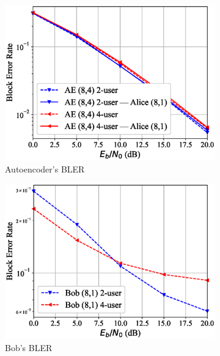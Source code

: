 \begin{figure}
	\begin{subfigure}{0.3\textwidth}
		\includegraphics[width=\linewidth]{figs/multi_covert_autoencoder_bler_rayleigh}
		\caption{Autoencoder's BLER}
		\label{fig:multi_rayleigh_resutls_ae}
	\end{subfigure}
	\hspace*{\fill}
	\begin{subfigure}{0.3\textwidth}
		\includegraphics[width=\linewidth]{figs/multi_bob_bler_rayleigh}
		\caption{Bob's BLER}
		\label{fig:multi_rayleigh_resutls_bob}	
	\end{subfigure}
	\hspace*{\fill}
	\begin{subfigure}{0.3\textwidth}

\end{subfigure}
\end{figure}
